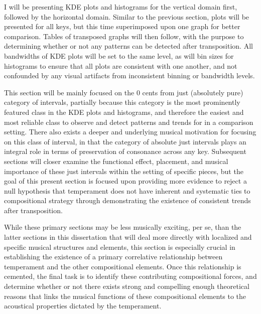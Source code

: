 I will be presenting KDE plots and histograms for the vertical domain
first, followed by the horizontal domain. Similar to the previous
section, plots will be presented for all keys, but this time
superimposed upon one graph for better comparison. Tables of transposed
graphs will then follow, with the purpose to determining whether or not
any patterns can be detected after transposition. All bandwidths of KDE
plots will be set to the same level, as will bin sizes for histograms to
ensure that all plots are consistent with one another, and not
confounded by any visual artifacts from inconsistent binning or
bandwidth levels.

This section will be mainly focused on the 0 cents from just (absolutely
pure) category of intervals, partially because this category is the most
prominently featured class in the KDE plots and histograms, and
therefore the easiest and most reliable class to observe and detect
patterns and trends for in a comparison setting. There also exists a
deeper and underlying musical motivation for focusing on this class of
interval, in that the category of absolute just intervals plays an
integral role in terms of preservation of consonance across any key.
Subsequent sections will closer examine the functional effect,
placement, and musical importance of these just intervals within the
setting of specific pieces, but the goal of this present section is
focused upon providing more evidence to reject a null hypothesis that
temperament does not have inherent and systematic ties to compositional
strategy through demonstrating the existence of consistent trends after
transposition.

While these primary sections may be less musically exciting, per se,
than the latter sections in this dissertation that will deal more
directly with localized and specific musical structures and elements,
this section is especially crucial in establishing the existence of a
primary correlative relationship between temperament and the other
compositional elements. Once this relationship is cemented, the final
task is to identify these contributing compositional forces, and
determine whether or not there exists strong and compelling enough
theoretical reasons that links the musical functions of these
compositional elements to the acoustical properties dictated by the
temperament.


